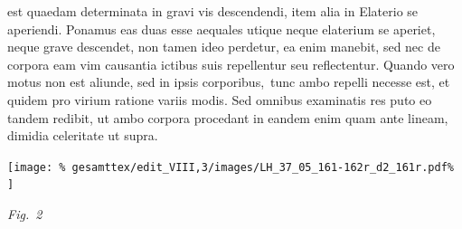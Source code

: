\protect{} est quaedam determinata in gravi%
\protect{}
vis descendendi,%
\protect{} item alia in Elaterio%
\protect{} se aperiendi.%
\protect{} Ponamus eas duas 
 esse aequales utique neque
%
elaterium\protect{} se aperiet, neque %
grave\protect{} descendet, non tamen ideo  
  {}
perdetur,
ea enim manebit, sed nec de
   {\lemma{}}
corpora 
  {\lemma{}}
eam vim causantia%
\protect{} ictibus%
\protect{} suis repellentur seu reflectentur.
Quando vero motus non est aliunde, 
sed in ipsis corporibus\lbrack,\rbrack\ tunc ambo repelli necesse est, et quidem pro virium%
\protect{} ratione variis modis. Sed omnibus examinatis res puto eo tandem redibit, ut ambo corpora procedant in eandem 
enim quam ante lineam, dimidia celeritate%
\protect{} ut supra.
\pend
%
\vspace{2.0em} %
\centerline{%
\texttt{[image: \%
gesamttex/edit\_VIII,3/images/LH\_37\_05\_161-162r\_d2\_161r.pdf\%
]}} 
\vspace{0.5em}
\centerline{%
\lbrack\textit{Fig.~2}\rbrack%
}
\newpage%
%
\pstart
\hspace{1mm}\hspace{-1mm}%
%
